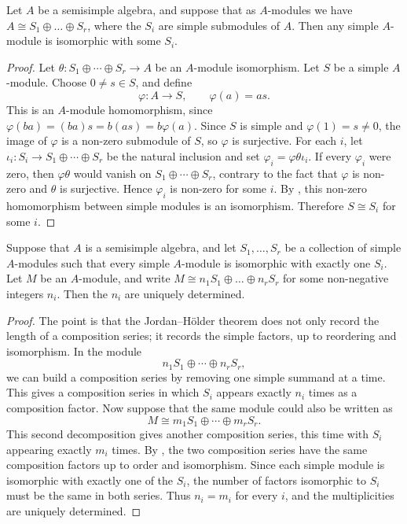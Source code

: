 \documentclass[../Odyssey_Project.tex]{subfiles}
\begin{document}
\begin{proposition}
\label{prop:13.4}
Let $A$ be a semisimple algebra, and suppose that as $A$-modules we have $A \cong S_1 \oplus \dots \oplus S_r$, where the $S_i$ are simple submodules of $A$. Then any simple $A$-module is isomorphic with some $S_i$.
\end{proposition}
\begin{proof}
    Let $\theta \colon S_1 \oplus \cdots \oplus S_r \to A$ be an $A$-module isomorphism.
    Let $S$ be a simple $A$-module. Choose $0 \neq s \in S$, and define
    \[
        \varphi \colon A \to S, \qquad \varphi(a) = as.
    \]
    This is an $A$-module homomorphism, since $\varphi(ba) = (ba)s = b(as) = b\varphi(a)$. Since $S$ is simple and $\varphi(1) = s \neq 0$, the image of $\varphi$ is a non-zero submodule of $S$, so $\varphi$ is surjective. For each $i$, let $\iota_i \colon S_i \to S_1 \oplus \cdots \oplus S_r$ be the natural inclusion and set $\varphi_i = \varphi\theta\iota_i$. If every $\varphi_i$ were zero, then $\varphi\theta$ would vanish on $S_1 \oplus \cdots \oplus S_r$, contrary to the fact that $\varphi$ is non-zero and $\theta$ is surjective. Hence $\varphi_i$ is non-zero for some $i$. By , this non-zero homomorphism between simple modules is an isomorphism. Therefore $S \cong S_i$ for some $i$.
\end{proof}

\begin{proposition}
\label{prop:13.5}
Suppose that $A$ is a semisimple algebra, and let $S_1, \dots, S_r$ be a collection of simple $A$-modules such that every simple $A$-module is isomorphic with exactly one $S_i$. Let $M$ be an $A$-module, and write $M \cong n_1 S_1 \oplus \dots \oplus n_r S_r$ for some non-negative integers $n_i$. Then the $n_i$ are uniquely determined.
\end{proposition}
\begin{proof}
    The point is that the Jordan--H\"older theorem does not only record the length of a composition series; it records the simple factors, up to reordering and isomorphism. In the module
    \[
        n_1 S_1 \oplus \cdots \oplus n_r S_r,
    \]
    we can build a composition series by removing one simple summand at a time. This gives a composition series in which $S_i$ appears exactly $n_i$ times as a composition factor. Now suppose that the same module could also be written as
    \[
        M \cong m_1S_1 \oplus \cdots \oplus m_rS_r.
    \]
    This second decomposition gives another composition series, this time with $S_i$ appearing exactly $m_i$ times. By , the two composition series have the same composition factors up to order and isomorphism. Since each simple module is isomorphic with exactly one of the $S_i$, the number of factors isomorphic to $S_i$ must be the same in both series. Thus $n_i=m_i$ for every $i$, and the multiplicities are uniquely determined.
\end{proof}
\end{document}
